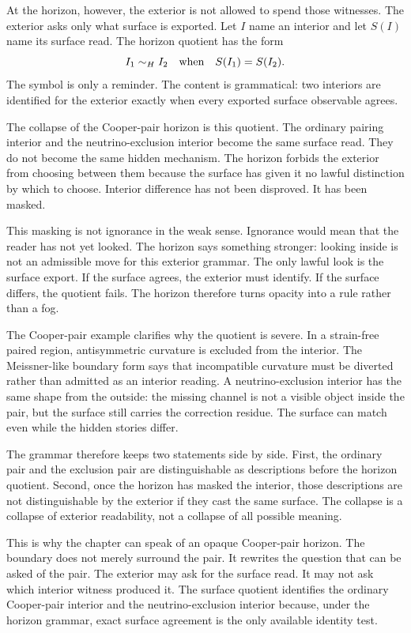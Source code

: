 At the horizon, however, the exterior is not allowed to spend those
witnesses. The exterior asks only what surface is exported. Let \(I\) name
an interior and let \(S(I)\) name its surface read. The horizon quotient has
the form
\[
  I_1 \sim_H I_2
  \quad\hbox{when}\quad
  S(I_1)=S(I_2).
\]
The symbol is only a reminder. The content is grammatical: two interiors are
identified for the exterior exactly when every exported surface observable
agrees.

The collapse of the Cooper-pair horizon is this quotient. The ordinary
pairing interior and the neutrino-exclusion interior become the same
surface read. They do not become the same hidden mechanism. The horizon
forbids the exterior from choosing between them because the surface has
given it no lawful distinction by which to choose. Interior difference has
not been disproved. It has been masked.

This masking is not ignorance in the weak sense. Ignorance would mean that
the reader has not yet looked. The horizon says something stronger: looking
inside is not an admissible move for this exterior grammar. The only lawful
look is the surface export. If the surface agrees, the exterior must
identify. If the surface differs, the quotient fails. The horizon therefore
turns opacity into a rule rather than a fog.

The Cooper-pair example clarifies why the quotient is severe. In a
strain-free paired region, antisymmetric curvature is excluded from the
interior. The Meissner-like boundary form says that incompatible curvature
must be diverted rather than admitted as an interior reading. A
neutrino-exclusion interior has the same shape from the outside: the missing
channel is not a visible object inside the pair, but the surface still
carries the correction residue. The surface can match even while the hidden
stories differ.

The grammar therefore keeps two statements side by side. First, the
ordinary pair and the exclusion pair are distinguishable as descriptions
before the horizon quotient. Second, once the horizon has masked the
interior, those descriptions are not distinguishable by the exterior if they
cast the same surface. The collapse is a collapse of exterior readability,
not a collapse of all possible meaning.

This is why the chapter can speak of an opaque Cooper-pair horizon. The
boundary does not merely surround the pair. It rewrites the question that
can be asked of the pair. The exterior may ask for the surface read. It may
not ask which interior witness produced it. The surface quotient identifies
the ordinary Cooper-pair interior and the neutrino-exclusion interior
because, under the horizon grammar, exact surface agreement is the only
available identity test.

